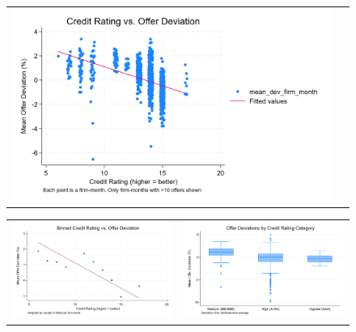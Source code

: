 \documentclass[12pt]{article}
\begin{document}
\begin{figure}[H]
\caption{}
 \label{fig:ie4_4}
\centering{}%
\begin{tabular}{cc}
\includegraphics[scale=0.17]{../figures/IE4/IE4_scatter_rating_offer.png} 
\end{tabular}
\end{figure}

\begin{figure}[H]
\caption{}
 \label{fig:ie4_5and6}
\centering{}%
\begin{tabular}{cc}
\includegraphics[scale=0.17]{../figures/IE4/IE4_binscatter_rating_offer.png} & \includegraphics[scale=0.17]{../figures/IE4/IE4_box_rating_offer.png}
\end{tabular}
\end{figure}
\end{document}

